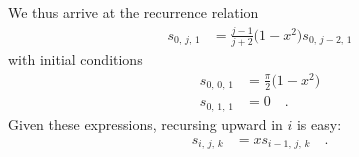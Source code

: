 \documentclass[modern]{aastex62}
\begin{document}
%
We thus arrive at the recurrence relation
%
\begin{align}
    s_{0,\,j,\,1} &= \frac{j - 1}{j + 2} \big(1 - x^2\big) s_{0,\,j-2,\,1}
\end{align}
%
with initial conditions
%
\begin{align}
    s_{0,\,0,\,1} &= \frac{\pi}{2} \big(1-x^2\big) \nonumber \\
    s_{0,\,1,\,1} &= 0 \quad.
\end{align}
%
Given these expressions, recursing upward in $i$ is easy:
%
\begin{align}
    s_{i,\,j,\,k} &= x s_{i-1,\,j,\,k} \quad.
\end{align}


\end{document}
